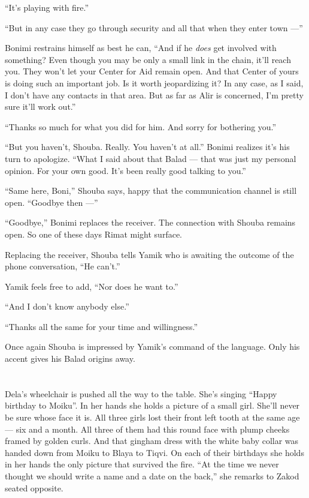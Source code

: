 \documentclass[twoside,11pt,openany]{book}
\begin{document}
``It's playing with fire.''

``But in any case they go through security and all that when they enter town ---''

Bonimi restrains himself as best he can, ``And if he \textit{does} get involved with something? Even though
you may be only a small link in the chain, it'll reach you. They won't let your Center for Aid remain open. And that
Center of yours is doing such an important job. Is it worth jeopardizing it? In any case, as I said, I don't have any
contacts in that area. But as far as Alir is concerned, I'm pretty sure it'll work out.''

``Thanks so much for what you did for him. And sorry for bothering you.''

``But you haven't, Shouba.  Really. You haven't at all.'' Bonimi realizes it's his turn to
apologize. ``What I said about that Balad --- that was just my personal opinion. For your own good. It's
been really good{ }talking to you.''

``Same here, Boni,'' Shouba says, happy that the communication channel is still open.
``Goodbye then ---''

``Goodbye,'' Bonimi replaces the receiver. The connection with Shouba remains open. So one of
these days Rimat might surface.

Replacing the receiver, Shouba tells Yamik who is awaiting the outcome of the phone conversation, ``He
can't.''

Yamik feels free to add, ``Nor does he want to.''

``And I don't know anybody else.''

``Thanks all the same for your time and willingness.''

Once again Shouba is impressed by Yamik's command of the language.  Only his accent gives his Balad origins away.



\chapter{}

Dela's wheelchair is pushed all the way to the table. She's singing ``Happy birthday to
Moiku''. In her hands she holds a picture of a small girl. She'll never be sure whose face it is. All
three girls lost their front left tooth at the same age --- six and a month. All three of them had this round face with
plump cheeks framed by golden curls. And that gingham dress with the white baby collar was handed down from Moiku to
Blaya to Tiqvi. On each of their birthdays she holds in her hands the only picture that survived the
fire. ``At the time we never thought we should write a name and a date on the back,'' she
remarks to Zakod seated opposite.
\end{document}
